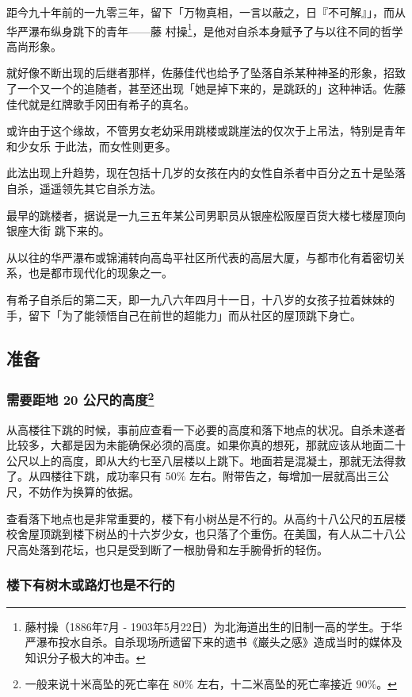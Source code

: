 \documentclass[UTF8]{ctexart}
\begin{document}
距今九十年前的一九零三年，留下「万物真相，一言以蔽之，日『不可解』」，而从华严瀑布纵身跳下的青年——藤
村操\footnote{藤村操（1886年7月 - 1903年5月22日）为北海道出生的旧制一高的学生。于华严瀑布投水自杀。自杀现场所遗留下来的遗书《巌头之感》造成当时的媒体及知识分子极大的冲击。}，是他对自杀本身赋予了与以往不同的哲学高尚形象。

就好像不断出现的后继者那样，佐藤佳代也给予了坠落自杀某种神圣的形象，招致了一个又一个的追随者，甚至还出现「她是掉下来的，是跳跃的」这种神话。佐藤佳代就是红牌歌手冈田有希子的真名。

或许由于这个缘故，不管男女老幼采用跳楼或跳崖法的仅次于上吊法，特别是青年和少女乐 于此法，而女性则更多。

此法出现上升趋势，现在包括十几岁的女孩在内的女性自杀者中百分之五十是坠落自杀，遥遥领先其它自杀方法。

最早的跳楼者，据说是一九三五年某公司男职员从银座松阪屋百货大楼七楼屋顶向银座大街 跳下来的。

从以往的华严瀑布或锦浦转向高岛平社区所代表的高层大厦，与都市化有着密切关系，也是都市现代化的现象之一。

有希子自杀后的第二天，即一九八六年四月十一日，十八岁的女孩子拉着妹妹的手，留下「为了能领悟自己在前世的超能力」而从社区的屋顶跳下身亡。

\subsection{准备}

\subsubsection*{需要距地 20 公尺的高度\footnote{一般来说十米高坠的死亡率在 $80\%$ 左右，十二米高坠的死亡率接近 $90\%$。}}

从高楼往下跳的时候，事前应查看一下必要的高度和落下地点的状况。自杀未遂者比较多，大都是因为未能确保必须的高度。如果你真的想死，那就应该从地面二十公尺以上的高度，即从大约七至八层楼以上跳下。地面若是混凝土，那就无法得救了。从四楼往下跳，成功率只有 $50\%$ 左右。附带告之，每增加一层就高出三公尺，不妨作为换算的依据。

查看落下地点也是非常重要的，楼下有小树丛是不行的。从高约十八公尺的五层楼校舍屋顶跳到楼下树丛的十六岁少女，也只落了个重伤。在美国，有人从二十八公尺高处落到花坛，也只是受到断了一根肋骨和左手腕骨折的轻伤。

\subsubsection*{楼下有树木或路灯也是不行的}
\end{document}
